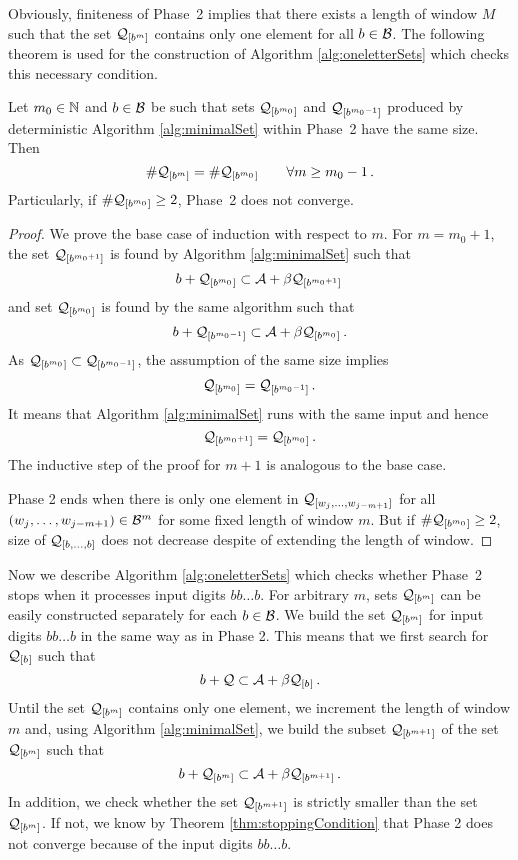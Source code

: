 Obviously, finiteness of Phase~2 implies that there exists a length of window $M$ such that the set $\mathcal{Q}_{[b^{m}]}$ contains only one element for all $b\in\mathcal{B}$. 
The following theorem is used for the construction of Algorithm \ref{alg:oneletterSets} which checks this necessary condition. 

\begin{theo}
\label{thm:stoppingCondition}
Let $m_0 \in \mathbb{N}$ and $b\in\mathcal{B}$ be such that sets $\mathcal{Q}_{[b^{m_0}]}$ and $\mathcal{Q}_{[b^{m_0-1}]}$ produced by deterministic Algorithm \ref{alg:minimalSet} within Phase~2 have the same size. Then
$$
    \#\mathcal{Q}_{[b^{m}]} = \#\mathcal{Q}_{[b^{m_0}]} \qquad \forall m\geq m_0-1\,.
$$ 
Particularly, if $\#\mathcal{Q}_{[b^{m_0}]}\geq 2$, Phase~2 does not converge.
\end{theo}
\begin{proof}
We prove the base case of induction with respect to $m$. For $m=m_0+1$, the set $\mathcal{Q}_{[b^{m_0+1}]}$ is found by Algorithm \ref{alg:minimalSet} such that 
$$
b + \mathcal{Q}_{[b^{m_0}]} \subset \mathcal{A} + \beta \mathcal{Q}_{[b^{m_0+1}]}\,
$$
and set $\mathcal{Q}_{[b^{m_0}]}$ is found by the same algorithm such that
$$
b + \mathcal{Q}_{[b^{m_0-1}]} \subset \mathcal{A} + \beta \mathcal{Q}_{[b^{m_0}]}\,.
$$
As $\mathcal{Q}_{[b^{m_0}]} \subset \mathcal{Q}_{[b^{m_0-1}]}$, the assumption of the same size implies
$$
    \mathcal{Q}_{[b^{m_0}]} = \mathcal{Q}_{[b^{m_0-1}]}\,.
$$
It means that Algorithm \ref{alg:minimalSet} runs with the same input and hence
$$
\mathcal{Q}_{[b^{m_0+1}]}=\mathcal{Q}_{[b^{m_0}]}\,.
$$
The inductive step of the proof for $m+1$ is analogous to the base case.

Phase 2 ends when there is only one element in $\mathcal{Q}_{[w_j,\dots, w_{j-m+1}]}$ for all $(w_j,\dots, w_{j-m+1}) \in \mathcal{B}^m$ for some fixed length of window $m$. But if $\#\mathcal{Q}_{[b^{m_0}]}\geq 2$, size of $\mathcal{Q}_{[b,\dots,b]}$ does not decrease despite of extending the length of window.
\end{proof}

 Now we describe Algorithm \ref{alg:oneletterSets} which checks whether Phase~2 stops when it processes input digits $bb\dots b$.
For arbitrary $m$, sets $\mathcal{Q}_{[b^{m}]}$  can be easily constructed separately for each $b\in\mathcal{B}$. We build the set $\mathcal{Q}_{[b^{m}]}$ for input digits $bb\dots b$ in the same way as in Phase 2. This means that we first search for $\mathcal{Q}_{[b^{}]}$ such that 
$$
b + \mathcal{Q} \subset \mathcal{A} + \beta \mathcal{Q}_{[b^{}]}\,.
$$
Until the set $\mathcal{Q}_{[b^{m}]}$ contains only one element, we increment the length of  window $m$ and, using Algorithm \ref{alg:minimalSet}, we build the subset $\mathcal{Q}_{[b^{m+1}]}$ of the set $\mathcal{Q}_{[b^{m}]}$ such that
$$
b + \mathcal{Q}_{[b^{m}]} \subset \mathcal{A} + \beta \mathcal{Q}_{[b^{m+1}]}\,.
$$
In addition, we check whether the set $\mathcal{Q}_{[b^{m+1}]}$ is strictly smaller than the set $\mathcal{Q}_{[b^{m}]}$. If not, we know by Theorem \ref{thm:stoppingCondition} that Phase 2 does not converge because of the input digits $bb\dots b$.

